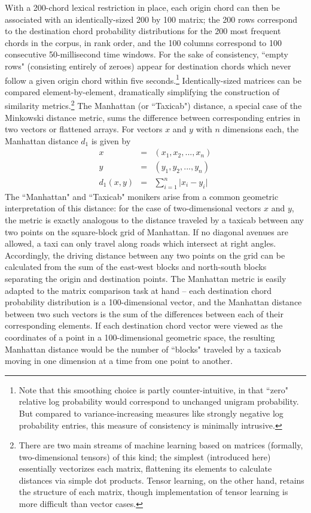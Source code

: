 With a 200-chord lexical restriction in place, each origin chord can then be associated with an identically-sized 200 by 100 matrix; the 200 rows correspond to the destination chord probability distributions for the 200 most frequent chords in the corpus, in rank order, and the 100 columns correspond to 100 consecutive 50-millisecond time windows.  For the sake of consistency, ``empty rows" (consisting entirely of zeroes) appear for destination chords which never follow a given origin chord within five seconds.\footnote{Note that this smoothing choice is partly counter-intuitive, in that ``zero" relative log probability would correspond to unchanged unigram probability.  But compared to variance-increasing measures like strongly negative log probability entries, this measure of consistency is minimally intrusive.}  Identically-sized matrices can be compared element-by-element, dramatically simplifying the construction of similarity metrics.\footnote{There are two main streams of machine learning based on matrices (formally, two-dimensional tensors) of this kind; the simplest (introduced here) essentially vectorizes each matrix, flattening its elements to calculate distances via simple dot products.  Tensor learning, on the other hand, retains the structure of each matrix, though implementation of tensor learning is more difficult than vector cases.}  The Manhattan (or ``Taxicab") distance, a special case of the Minkowski distance metric, sums the difference between corresponding entries in two vectors or flattened arrays.  For vectors $x$ and $y$ with $n$ dimensions each, the Manhattan distance $d_1$ is given by
\begin{eqnarray*}
x &=& (x_1,x_2,...,x_n) \\
y &=& (y_1,y_2,...,y_n) \\
d_1(x,y) &=& \sum_{i=1}^n \lvert x_i - y_i \rvert
\end{eqnarray*}
The ``Manhattan" and ``Taxicab" monikers arise from a common geometric interpretation of this distance: for the case of two-dimensional vectors $x$ and $y$, the metric is exactly analogous to the distance traveled by a taxicab between any two points on the square-block grid of Manhattan.  If no diagonal avenues are allowed, a taxi can only travel along roads which intersect at right angles.  Accordingly, the driving distance between any two points on the grid can be calculated from the sum of the east-west blocks and north-south blocks separating the origin and destination points.  The Manhattan metric is easily adapted to the matrix comparison task at hand -- each destination chord probability distribution is a 100-dimensional vector, and the Manhattan distance between two such vectors is the sum of the differences between each of their corresponding elements.  If each destination chord vector were viewed as the coordinates of a point in a 100-dimensional geometric space, the resulting Manhattan distance would be the number of ``blocks" traveled by a taxicab moving in one dimension at a time from one point to another.

